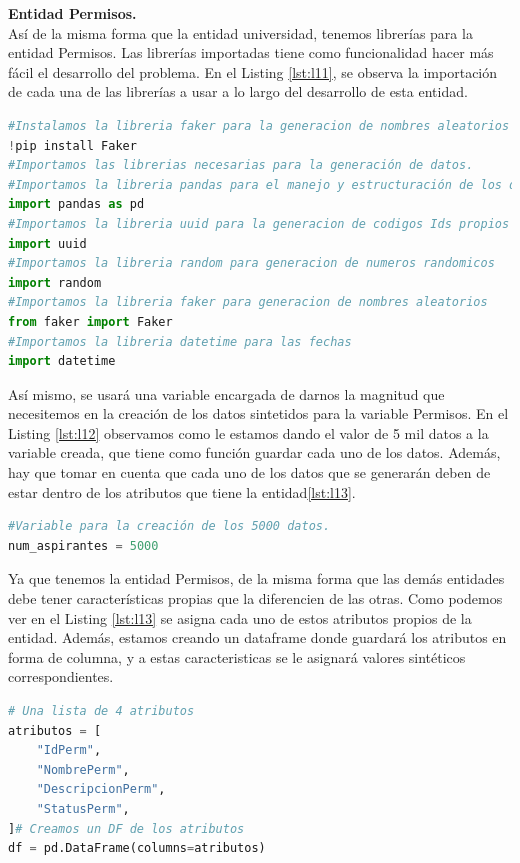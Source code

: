 \documentclass[10pt, oneside,spanish]{article}   	%
\begin{document}
\textbf{Entidad Permisos.}
\\Así de la misma forma que la entidad universidad, tenemos librerías para la entidad Permisos. Las librerías importadas tiene como funcionalidad hacer más fácil el desarrollo del problema. En el Listing \ref{lst:l11}, se observa la importación de cada una de las librerías a usar a lo largo del desarrollo de esta entidad. 
\begin{lstlisting}[language=Python,label={lst:l11},caption=Librerías a utilizar en la entidad Permisos,frame=single, ]
#Instalamos la libreria faker para la generacion de nombres aleatorios
!pip install Faker
#Importamos las librerias necesarias para la generación de datos.
#Importamos la libreria pandas para el manejo y estructuración de los datos sinteticos
import pandas as pd
#Importamos la libreria uuid para la generacion de codigos Ids propios
import uuid
#Importamos la libreria random para generacion de numeros randomicos
import random
#Importamos la libreria faker para generacion de nombres aleatorios
from faker import Faker
#Importamos la libreria datetime para las fechas
import datetime
\end{lstlisting}
Así mismo, se usará una variable encargada de darnos la magnitud que necesitemos en la creación de los datos sintetidos para la variable Permisos. En el Listing \ref{lst:l12} observamos como le estamos dando el valor de 5 mil datos a la variable creada, que tiene como función guardar cada uno de los datos. Además, hay que tomar en cuenta que cada uno de los datos que se generarán deben de estar dentro de los atributos que tiene la entidad\ref{lst:l13}.
\begin{lstlisting}[language=Python,label={lst:l12},caption=Variable para guardar los datos sintéticos,frame=single, ]
#Variable para la creación de los 5000 datos.
num_aspirantes = 5000
\end{lstlisting}
Ya que tenemos la entidad Permisos, de la misma forma que las demás entidades debe tener características propias que la diferencien de las otras. Como podemos ver en el Listing \ref{lst:l13} se asigna cada uno de estos atributos propios de la entidad. Además, estamos creando un dataframe donde guardará los atributos en forma de columna, y a estas caracteristicas se le asignará valores sintéticos correspondientes.
\begin{lstlisting}[language=Python,label={lst:l13},caption=Lista de atributos para la entidad Permisos,frame=single, ]
# Una lista de 4 atributos
atributos = [
    "IdPerm",
    "NombrePerm",
    "DescripcionPerm",
    "StatusPerm",
]# Creamos un DF de los atributos
df = pd.DataFrame(columns=atributos)
\end{lstlisting}
\end{document}
